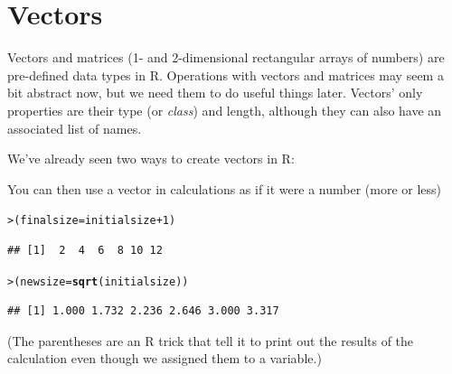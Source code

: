 \documentclass[11pt]{article}\usepackage[]{graphicx}\usepackage[]{color}
\makeatletter
\newcommand{\hlnum}[1]{\textcolor[rgb]{0.686,0.059,0.569}{#1}}%
\newcommand{\hlstr}[1]{\textcolor[rgb]{0.192,0.494,0.8}{#1}}%
\newcommand{\hlopt}[1]{\textcolor[rgb]{0,0,0}{#1}}%
\newcommand{\hlstd}[1]{\textcolor[rgb]{0.345,0.345,0.345}{#1}}%
\newcommand{\hlkwb}[1]{\textcolor[rgb]{0.69,0.353,0.396}{#1}}%
\newcommand{\hlkwd}[1]{\textcolor[rgb]{0.737,0.353,0.396}{\textbf{#1}}}%
\newenvironment{kframe}{%
 \def\at@end@of@kframe{}%
 \ifinner\ifhmode%
  \def\at@end@of@kframe{\end{minipage}}%
  \begin{minipage}{\columnwidth}%
 \fi\fi%
 \def\FrameCommand##1{\hskip\@totalleftmargin \hskip-\fboxsep
 \colorbox{shadecolor}{##1}\hskip-\fboxsep
     \hskip-\linewidth \hskip-\@totalleftmargin \hskip\columnwidth}%
 \MakeFramed {\advance\hsize-\width
   \@totalleftmargin\z@ \linewidth\hsize
   \@setminipage}}%
 {\par\unskip\endMakeFramed%
 \at@end@of@kframe}
\newenvironment{knitrout}{}{} %
\newcommand{\code}[1]{{\tt #1}}
\newcommand\R{{\sf R}}
\numberwithin{exercise}{section}
\makeatother
\begin{document}
\section{Vectors} 

Vectors and matrices (1- and 2-dimensional rectangular arrays of 
numbers) are pre-defined data types in \R. Operations with vectors 
and matrices may seem a bit abstract now, but we need them to do 
useful things later. 
Vectors' only properties are their type (or \emph{class})
and length, although they can also have an
associated list of names.

We've already seen two ways to create vectors in \R:

You can then use a vector in calculations as if it were 
a number (more or less) 
\begin{knitrout}
\color{fgcolor}\begin{kframe}
\begin{alltt}
\hlstd{> }\hlstd{(finalsize} \hlkwb{=} \hlstd{initialsize} \hlopt{+} \hlnum{1}\hlstd{)}
\end{alltt}
\begin{verbatim}
## [1]  2  4  6  8 10 12
\end{verbatim}
\begin{alltt}
\hlstd{> }\hlstd{(newsize} \hlkwb{=} \hlkwd{sqrt}\hlstd{(initialsize))}
\end{alltt}
\begin{verbatim}
## [1] 1.000 1.732 2.236 2.646 3.000 3.317
\end{verbatim}
\end{kframe}
\end{knitrout}
(The parentheses are an R trick that tell it to print
out the results of the calculation even though we
assigned them to a variable.)
\end{document}

